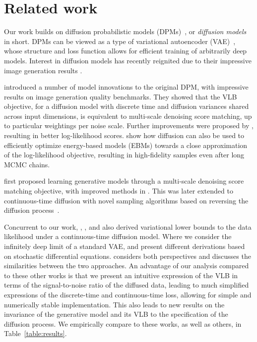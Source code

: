 \documentclass{article}
\begin{document}
\section{Related work}
\label{sec:relatedwork}

Our work builds on diffusion probabilistic models (DPMs)~\citep{sohl2015deep}, or \emph{diffusion models} in short. DPMs can be viewed as a type of variational autoencoder (VAE)~\citep{kingma2013auto,rezende2014stochastic}, whose structure and loss function allows for efficient training of arbitrarily deep models. Interest in diffusion models has recently reignited due to their impressive image generation results \citep{ho2020denoising, song2020improved}.

\citet{ho2020denoising} introduced a number of model innovations to the original DPM, with impressive results on image generation quality benchmarks. They showed that the VLB objective, for a diffusion model with discrete time and diffusion variances shared across input dimensions, is equivalent to multi-scale denoising score matching, up to particular weightings per noise scale. Further improvements were proposed by \citet{nichol2021improved}, resulting in better log-likelihood scores. \citet{gao2020learning} show how diffusion can also be used to efficiently optimize energy-based models (EBMs) towards a close approximation of the log-likelihood objective, resulting in high-fidelity samples even after long MCMC chains.

\citet{song2019generative} first proposed learning generative models through a multi-scale denoising score matching objective, with improved methods in \citet{song2020improved}. This was later extended to continuous-time diffusion with novel sampling algorithms based on reversing the diffusion process~\citep{song2020score}. 






Concurrent to our work, \cite{song2021maximum}, \cite{huang2021variational}, and \cite{vahdat2021score} also derived variational lower bounds to the data likelihood under a continuous-time diffusion model. Where we consider the infinitely deep limit of a standard VAE, \cite{song2021maximum} and \cite{vahdat2021score} present different derivations based on stochastic differential equations. \cite{huang2021variational} considers both perspectives and discusses the similarities between the two approaches. An advantage of our analysis compared to these other works is that we present an intuitive expression of the VLB in terms of the signal-to-noise ratio of the diffused data, leading to much simplified expressions of the discrete-time and continuous-time loss, allowing for simple and numerically stable implementation. This also leads to new results on the invariance of the generative model and its VLB to the specification of the diffusion process. We empirically compare to these works, as well as others, in Table~\ref{table:results}.
\end{document}
